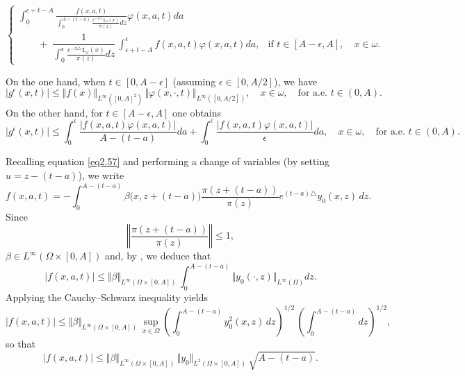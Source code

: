 \documentclass[10pt, a4]{amsart}
\makeatletter
\newcounter{assu}
\theoremstyle{plain}
\theoremstyle{definition}
\theoremstyle{remark}
\renewenvironment{proof}[1][\proofname]{\par
  \pushQED{\qed}%
  \normalfont \topsep6\p@\@plus6\p@\relax
  \trivlist
  \item[\hskip\labelsep
        \itshape
    #1\ \ref{#1}.]\ignorespaces
}{%
  \popQED\endtrivlist\@endpefalse
}
\numberwithin{equation}{section}
\def\to{\rightarrow}
\makeatother
\begin{document}
\begin{proof}[of Theorem \ref{th1.4}]
\begin{equation}
\begin{cases}
\displaystyle\int_0^{\epsilon+t-A} \frac{f(x,a,t)}{\displaystyle\int_{0}^{A-(t-a)}\frac{e^{-z\triangle}\mathds{1}_{\omega}(x)}{\pi(z)}dz}\varphi(x,a,t)da \\[1.5ex]
\quad\quad+\; \dfrac{1}{\displaystyle\int_{0}^{\epsilon}\frac{e^{-z\triangle}\mathds{1}_{\omega}(x)}{\pi(z)}dz}\,\displaystyle\int_{\epsilon+t-A}^\epsilon f(x,a,t)\varphi(x,a,t)da, & \text{if } t\in [A-\epsilon,A],\quad x\in \omega.
\end{cases}
\end{equation}

On the one hand, when \( t\in [0,A-\epsilon] \) (assuming \(\epsilon\in [0,A/2]\)), we have
\[
\left|g^{\epsilon}(x,t)\right| \leq \Vert f(x)\Vert_{L^{\infty}([0,A]^2)}\,\Vert\varphi(x,\cdot,t)\Vert_{L^{\infty}([0,A/2])},\quad x\in \omega,\quad \text{for a.e. } t\in (0,A).
\]
On the other hand, for \( t\in [A-\epsilon,A] \) one obtains
\[
\left|g^{\epsilon}(x,t)\right| \leq \int_0^{\epsilon} \frac{\bigl| f(x,a,t)\varphi(x,a,t)\bigr|}{A-(t-a)}da + \int_{0}^\epsilon \frac{\bigl| f(x,a,t)\varphi(x,a,t)\bigr|}{\epsilon}da,\quad x\in \omega,\quad \text{for a.e. } t\in (0,A).
\]

Recalling equation \eqref{eq2.57} and performing a change of variables (by setting \( u=z-(t-a) \)), we write
\[
f(x,a,t)=-\int_{0}^{A-(t-a)} \beta\bigl(x,z+(t-a)\bigr)\frac{\pi(z+(t-a))}{\pi(z)}e^{(t-a)\triangle}y_{0}(x,z)\,dz.
\]
Since 
\[
\left\Vert \frac{\pi(z+(t-a))}{\pi(z)} \right\Vert \leq 1,
\]
\(\beta\in L^{\infty}(\Omega \times [0,A])\) and, by \cite[Lemma 4.1]{ref3}, we deduce that
\[
\left| f(x,a,t)\right| \leq \Vert \beta\Vert_{L^{\infty}(\Omega\times [0,A])}\,\int_{0}^{A-(t-a)} \Vert y_{0}(\cdot,z)\Vert_{L^{\infty}(\Omega)}dz.
\]
Applying the Cauchy–Schwarz inequality yields
\[
\left| f(x,a,t)\right| \leq \Vert \beta\Vert_{L^{\infty}(\Omega\times [0,A])}\,\sup_{x\in\Omega}\left(\int_{0}^{A-(t-a)}y_{0}^2(x,z)\,dz\right)^{1/2}\,\left(\int_{0}^{A-(t-a)}dz\right)^{1/2},
\]
so that
\[
\left| f(x,a,t)\right| \leq \Vert \beta\Vert_{L^{\infty}(\Omega\times [0,A])}\,\Vert y_{0}\Vert_{L^2(\Omega\times[0,A])}\,\sqrt{A-(t-a)}.
\]


\end{proof}
\end{document}
